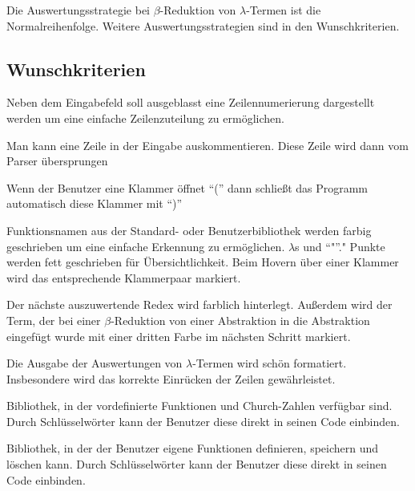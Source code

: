 \documentclass[parskip=full,11pt,twoside]{scrartcl}
\begin{document}
Die Auswertungsstrategie bei $\beta$-Reduktion von $\lambda$-Termen ist die Normalreihenfolge. Weitere Auswertungsstrategien sind in den Wunschkriterien.


\newpage
\subsection{Wunschkriterien}

Neben dem Eingabefeld soll ausgeblasst eine Zeilennumerierung dargestellt werden um eine einfache Zeilenzuteilung zu ermöglichen.

Man kann eine Zeile in der Eingabe auskommentieren. Diese Zeile wird dann vom Parser übersprungen

Wenn der Benutzer eine Klammer öffnet \enquote{(} dann schließt das Programm automatisch diese Klammer mit \enquote{)}

Funktionsnamen aus der Standard- oder Benutzerbibliothek werden farbig geschrieben um eine einfache Erkennung zu ermöglichen. $\lambda$s  und \enquote"." Punkte werden fett geschrieben für Übersichtlichkeit. Beim Hovern über einer Klammer wird das entsprechende Klammerpaar markiert.

Der nächste auszuwertende Redex wird farblich hinterlegt.
Außerdem wird der Term, der bei einer $\beta$-Reduktion von einer Abstraktion in die Abstraktion eingefügt wurde mit einer dritten Farbe im nächsten Schritt markiert.

Die Ausgabe der Auswertungen von $\lambda$-Termen wird schön formatiert. Insbesondere wird das korrekte Einrücken der Zeilen gewährleistet.

Bibliothek, in der vordefinierte Funktionen und Church-Zahlen verfügbar sind. Durch Schlüsselwörter kann der Benutzer diese direkt in seinen Code einbinden.

Bibliothek, in der der Benutzer eigene Funktionen definieren, speichern und löschen kann. Durch Schlüsselwörter kann der Benutzer diese direkt in seinen Code einbinden.
\end{document}
